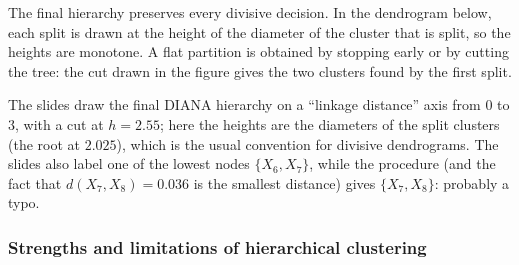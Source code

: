 The final hierarchy preserves every divisive decision. In the dendrogram below, each split is drawn at the height of the diameter of the cluster that is split, so the heights are monotone. A flat partition is obtained by stopping early or by cutting the tree: the cut drawn in the figure gives the two clusters found by the first split.

\begin{center}
\end{center}

\begin{remark}
The slides draw the final DIANA hierarchy on a ``linkage distance'' axis from $0$ to $3$, with a cut at $h = 2.55$; here the heights are the diameters of the split clusters (the root at $2.025$), which is the usual convention for divisive dendrograms. The slides also label one of the lowest nodes $\{X_6, X_7\}$, while the procedure (and the fact that $d(X_7, X_8) = 0.036$ is the smallest distance) gives $\{X_7, X_8\}$: probably a typo.
\end{remark}

\subsubsection{Strengths and limitations of hierarchical clustering}

